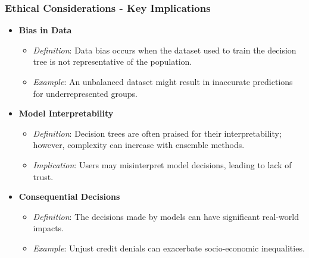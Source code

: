 \documentclass[aspectratio=169]{beamer}
\begin{document}
\begin{frame}[fragile]
    \frametitle{Ethical Considerations - Key Implications}
    \begin{itemize}
        \item \textbf{Bias in Data}
        \begin{itemize}
            \item \textit{Definition}: Data bias occurs when the dataset used to train the decision tree is not representative of the population.
            \item \textit{Example}: An unbalanced dataset might result in inaccurate predictions for underrepresented groups.
        \end{itemize}
        
        \item \textbf{Model Interpretability}
        \begin{itemize}
            \item \textit{Definition}: Decision trees are often praised for their interpretability; however, complexity can increase with ensemble methods.
            \item \textit{Implication}: Users may misinterpret model decisions, leading to lack of trust.
        \end{itemize}
        
        \item \textbf{Consequential Decisions}
        \begin{itemize}
            \item \textit{Definition}: The decisions made by models can have significant real-world impacts.
            \item \textit{Example}: Unjust credit denials can exacerbate socio-economic inequalities.
        \end{itemize}
    \end{itemize}
\end{frame}
\end{document}
